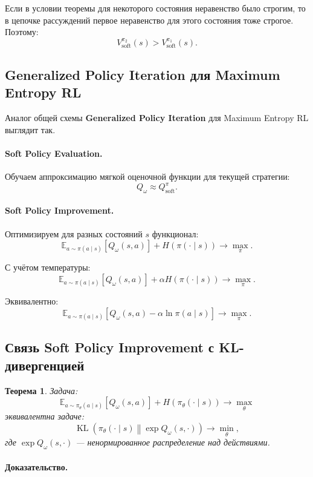 \documentclass[12pt,a4paper]{article}
\newtheorem{theorem}{Теорема}
\begin{document}
Если в условии теоремы для некоторого состояния неравенство было строгим, то в цепочке рассуждений первое неравенство для этого состояния тоже строгое. Поэтому:
\[
V^{\pi_2}_{\mathrm{soft}}(s)
>
V^{\pi_1}_{\mathrm{soft}}(s).
\]

\subsection{Generalized Policy Iteration для Maximum Entropy RL}

Аналог общей схемы \textbf{Generalized Policy Iteration} для Maximum Entropy RL выглядит так.

\paragraph{Soft Policy Evaluation.}

Обучаем аппроксимацию мягкой оценочной функции для текущей стратегии:
\[
Q_\omega
\approx
Q^\pi_{\mathrm{soft}}.
\]

\paragraph{Soft Policy Improvement.}

Оптимизируем для разных состояний $s$ функционал:
\[
\mathbb E_{a\sim\pi(a\mid s)}
\left[
Q_\omega(s,a)
\right]
+
H(\pi(\cdot\mid s))
\to
\max_{\pi}.
\]

С учётом температуры:
\[
\mathbb E_{a\sim\pi(a\mid s)}
\left[
Q_\omega(s,a)
\right]
+
\alpha H(\pi(\cdot\mid s))
\to
\max_{\pi}.
\]

Эквивалентно:
\[
\mathbb E_{a\sim\pi(a\mid s)}
\left[
Q_\omega(s,a)
-
\alpha\ln\pi(a\mid s)
\right]
\to
\max_{\pi}.
\]

\subsection{Связь Soft Policy Improvement с KL-дивергенцией}

\begin{theorem}
Задача:
\[
\mathbb E_{a\sim\pi_\theta(a\mid s)}
\left[
Q_\omega(s,a)
\right]
+
H(\pi_\theta(\cdot\mid s))
\to
\max_{\theta}
\]
эквивалентна задаче:
\[
\operatorname{KL}
\left(
\pi_\theta(\cdot\mid s)
\middle\|
\exp Q_\omega(s,\cdot)
\right)
\to
\min_{\theta},
\]
где $\exp Q_\omega(s,\cdot)$ --- ненормированное распределение над действиями.
\end{theorem}

\paragraph{Доказательство.}
\end{document}
